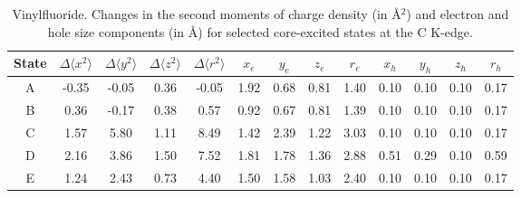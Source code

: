 \documentclass[journal=jctcce,manuscript=article]{achemso}
\begin{document}
 \begin{table}[H]
 \centering
 \caption{Vinylfluoride. Changes in the 
   second moments of charge density (in \AA$^2$) 
   and electron and hole size components (in \AA) for  selected core-excited states at the C K-edge.
   \label{vinylfluoride-sizes-Cedge}}
 \vspace{1em}
 \begin{tabular}{c|cccc|cccc|cccc}
     \hline
    State
     & $\Delta \langle x^2 \rangle$ 
     & $\Delta \langle y^2 \rangle$
     & $\Delta \langle z^2 \rangle$
     & $\Delta \langle r^2 \rangle$
     & $x_e$ 
     & $y_e$ 
     & $z_e$ 
     & $r_e$ 
     & $x_h$ 
     & $y_h$ 
     & $z_h$ 
     & $r_h$ 
     \\
     \hline
     A
     & -0.35 & -0.05 & 0.36 & -0.05
     & 1.92 & 0.68 & 0.81 & 1.40
     & 0.10 & 0.10 & 0.10 & 0.17
     \\
         B 
&  0.36 & -0.17 & 0.38 & 0.57
     & 0.92 & 0.67 & 0.81 & 1.39
     & 0.10 & 0.10 & 0.10 & 0.17
     \\
             C 
& 1.57 & 5.80 & 1.11 & 8.49
     & 1.42 & 2.39 & 1.22 & 3.03
     & 0.10 & 0.10 & 0.10 & 0.17
     \\
                  D 
& 2.16 & 3.86 & 1.50 & 7.52
     & 1.81 & 1.78 & 1.36 & 2.88
     & 0.51 & 0.29 & 0.10 & 0.59
     \\
                  E 
& 1.24 & 2.43 & 0.73 & 4.40
     & 1.50 & 1.58 & 1.03 & 2.40
     & 0.10 & 0.10 & 0.10 & 0.17
     \\
     \hline
 \end{tabular}
 \end{table}
%
\end{document}
